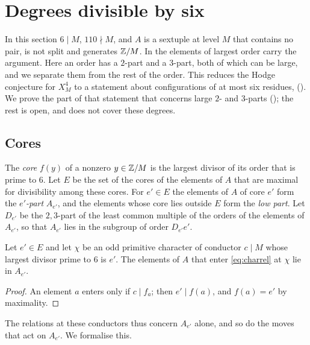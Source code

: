 \section{Degrees divisible by six}\label{sec:six}

In this section $6\mid M$, $110\nmid M$, and $A$ is a sextuple at level $M$
that contains no pair, is not split and generates $\mathbb{Z}/M$. In
 the elements of largest order carry the
argument. Here an order has a $2$-part and a $3$-part, both of which can be
large, and we separate them from the rest of the order. This reduces the
Hodge conjecture for $X^{4}_{M}$ to a statement about configurations of at
most six residues,  (). We prove the part of
that statement that concerns large $2$- and $3$-parts
(); the rest is open, and  does not
cover these degrees.

\subsection{Cores}
The \emph{core} $f(y)$ of a nonzero $y\in\mathbb{Z}/M$ is the largest divisor of
its order that is prime to $6$. Let $E$ be the set of the cores of the
elements of $A$ that are maximal for divisibility among these cores. For
$e'\in E$ the elements of $A$ of core $e'$ form the \emph{$e'$-part} $A_{e'}$,
and the elements whose core lies outside $E$ form the \emph{low part}. Let
$D_{e'}$ be the $2,3$-part of the least common multiple of the orders of the
elements of $A_{e'}$, so that $A_{e'}$ lies in the subgroup of order
$D_{e'}e'$.

\begin{lemma}\label{lem:corerel}
Let $e'\in E$ and let $\chi$ be an odd primitive character of conductor
$c\mid M$ whose largest divisor prime to $6$ is $e'$. The elements of $A$
that enter \eqref{eq:charrel} at $\chi$ lie in $A_{e'}$.
\end{lemma}

\begin{proof}
An element $a$ enters only if $c\mid f_{a}$; then $e'\mid f(a)$, and
$f(a)=e'$ by maximality.
\end{proof}

The relations at these conductors thus concern $A_{e'}$ alone, and so do the
moves that act on $A_{e'}$. We formalise this.

